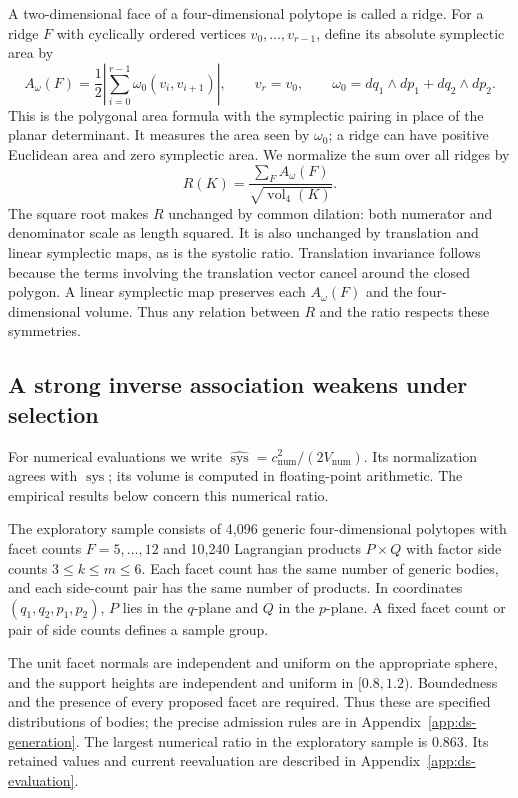 A two-dimensional face of a four-dimensional polytope is called a ridge.
For a ridge $F$ with cyclically ordered vertices $v_0,\ldots,v_{r-1}$, define
its absolute symplectic area by
\[
 A_\omega(F)=\frac12\left|\sum_{i=0}^{r-1}\omega_0(v_i,v_{i+1})\right|,
 \qquad v_r=v_0,\qquad
 \omega_0=dq_1\wedge dp_1+dq_2\wedge dp_2.
\]
This is the polygonal area formula with the symplectic pairing in place
of the planar determinant. It measures the area seen by $\omega_0$; a
ridge can have positive Euclidean area and zero symplectic area. We
normalize the sum over all ridges by
\[
 R(K)=\frac{\sum_F A_\omega(F)}{\sqrt{\operatorname{vol}_4(K)}}.
\]
The square root makes $R$ unchanged by common dilation: both numerator
and denominator scale as length squared. It is also unchanged by
translation and linear symplectic maps, as is the systolic ratio.
Translation invariance follows because the terms involving the
translation vector cancel around the closed polygon. A linear symplectic
map preserves each $A_\omega(F)$ and the four-dimensional volume.
Thus any relation between $R$ and the ratio respects these symmetries.

\subsection{A strong inverse association weakens under selection}

For numerical evaluations we write
$\widehat{\operatorname{sys}}=c_{\mathrm{num}}^2/(2V_{\mathrm{num}})$.
Its normalization agrees with $\operatorname{sys}$; its volume is computed
in floating-point arithmetic. The empirical results below concern this
numerical ratio.

The exploratory sample consists of 4,096 generic four-dimensional polytopes
with facet counts $F=5,\ldots,12$ and 10,240 Lagrangian products $P\times Q$
with factor side counts $3\leq k\leq m\leq6$. Each facet count has the
same number of generic bodies, and each side-count pair has the same
number of products. In coordinates $(q_1,q_2,p_1,p_2)$, $P$ lies in the $q$-plane and
$Q$ in the $p$-plane. A fixed facet count or pair of side counts defines a
sample group.

The unit facet normals are independent and uniform on the appropriate
sphere, and the support heights are independent and uniform in
$[0.8,1.2)$. Boundedness and the presence of every proposed facet are
required. Thus these are specified distributions of bodies; the precise
admission rules are in Appendix~\ref{app:ds-generation}. The largest
numerical ratio in the exploratory sample is $0.863$. Its retained values
and current reevaluation are described in Appendix~\ref{app:ds-evaluation}.

